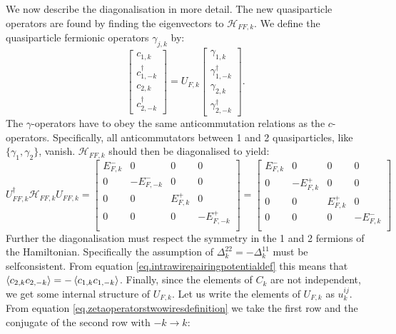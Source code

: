 We now describe the diagonalisation in more detail. The new quasiparticle operators are found by finding the eigenvectors to $\mathcal{H}_{FF,k}$. We define the quasiparticle fermionic operators $\gamma_{j,k}$ by:
\begin{equation}
\begin{bmatrix} c_{1,k} \\ c^\dagger_{1,-k} \\ c_{2,k} \\ c^\dagger_{2,-k} \end{bmatrix} = U_{F,k}\begin{bmatrix} \gamma_{1,k} \\ \gamma^{\dagger}_{1,-k} \\ \gamma_{2,k} \\ \gamma^{\dagger}_{2,-k} \end{bmatrix}.
\label{eq.zetaoperatorstwowiresdefinition}
\end{equation} 
The $\gamma$-operators have to obey the same anticommutation relations as the $c$-operators. Specifically, all anticommutators between 1 and 2 quasiparticles, like $\{\gamma_1, \gamma_2 \} $, vanish. $\mathcal{H}_{FF,k}$ should then be diagonalised to yield:
\begin{equation}
U^\dagger_{FF,k}\mathcal{H}_{FF,k}U_{FF,k} = \begin{bmatrix} 
E^{-}_{F,k} & 0        & 0       & 0        \\ 
0       & -E^{-}_{F,-k} & 0       & 0        \\ 
0       & 0        & E^{+}_{F,k} & 0        \\ 
0       & 0        & 0       & -E^{+}_{F,-k} \\ 
\end{bmatrix} = \begin{bmatrix} 
E^{-}_{F,k} & 0        & 0       & 0        \\ 
0       & -E^{+}_{F,k} & 0       & 0        \\ 
0       & 0        & E^{+}_{F,k} & 0        \\ 
0       & 0        & 0       & -E^{-}_{F,k} \\ 
\end{bmatrix} \nonumber
\end{equation}
Further the diagonalisation must respect the symmetry in the 1 and 2 fermions of the Hamiltonian. Specifically the assumption of $\Delta^{22}_k = -\Delta^{11}_k$ must be selfconsistent. From equation \ref{eq.intrawirepairingpotentialdef} this means that $\braket{c_{2,k}c_{2,-k}} = -\braket{c_{1,k}c_{1,-k}}$. Finally, since the elements of $C_k$ are not independent, we get some internal structure of $U_{F,k}$. Let us write the elements of $U_{F,k}$ as $u^{ij}_k$. From equation \eqref{eq.zetaoperatorstwowiresdefinition} we take the first row and the conjugate of the second row with $-k \to k$:
